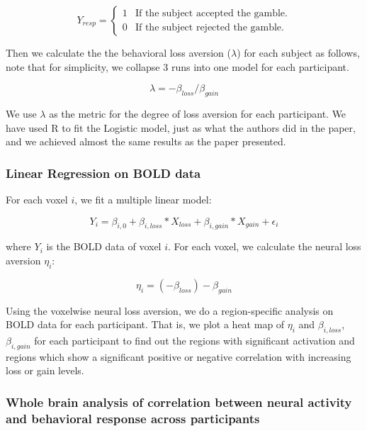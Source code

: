 \documentclass[11pt]{article}
\begin{document}
\begin{displaymath}
Y_{resp} = \left \{ \begin{array}{ll}
1 & \textrm{If the subject accepted the gamble.} \\
0 & \textrm{If the subject rejected the gamble.}
\end{array} \right .
\end{displaymath}

Then we calculate the the behavioral loss aversion ($ \lambda $) for each subject as follows, note that for simplicity, we collapse 3 runs into one model for each participant.

\begin{equation}
\lambda = -\beta_{loss} / \beta_{gain}
\end{equation}

We use $\lambda$ as the metric for the degree of loss aversion for each participant. We have used R to fit the Logistic model, just as what the authors did in the paper, and we achieved almost the same results as the paper presented.

\subsubsection{Linear Regression on BOLD data}

For each voxel $i$, we fit a multiple linear model:

\begin{equation}
Y_{i} = \beta_{i, 0} + \beta_{i, loss} *X_{loss} + \beta_{i, gain} * X_{gain}  + \epsilon_i
\end{equation}

where $Y_{i}$ is the BOLD data of voxel $i$. For each voxel, we calculate the neural loss aversion $\eta_i$:

\begin{equation}
\eta_i = (-\beta_{loss}) - \beta_{gain}
\end{equation}

Using the voxelwise neural loss aversion, we do a region-specific analysis on BOLD data for each participant. That is, we plot a heat map of $\eta_i$ and  $\beta_{i, loss}$, $ \beta_{i, gain}$ for each participant to find out the regions with significant activation and regions which show a significant positive or negative correlation with increasing loss or gain levels.

\subsubsection{Whole brain analysis of correlation between neural activity and behavioral response across participants}
\end{document}
